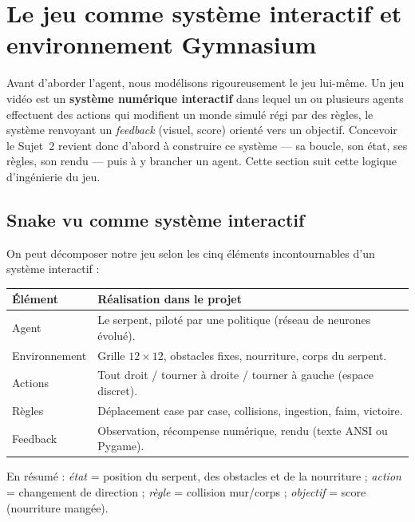 \documentclass[11pt,a4paper]{article}
\begin{document}
\section{Le jeu comme système interactif et environnement Gymnasium}

Avant d'aborder l'agent, nous modélisons rigoureusement le jeu lui-même. Un jeu
vidéo est un \textbf{système numérique interactif} dans lequel un ou plusieurs
agents effectuent des actions qui modifient un monde simulé régi par des règles,
le système renvoyant un \emph{feedback} (visuel, score) orienté vers un objectif.
Concevoir le Sujet~2 revient donc d'abord à construire ce système — sa boucle, son
état, ses règles, son rendu — puis à y brancher un agent. Cette section suit cette
logique d'ingénierie du jeu.

\subsection{Snake vu comme système interactif}
On peut décomposer notre jeu selon les cinq éléments incontournables d'un système
interactif :
\begin{center}
\begin{tabular}{ll}
\toprule
\textbf{Élément} & \textbf{Réalisation dans le projet} \\
\midrule
Agent          & Le serpent, piloté par une politique (réseau de neurones évolué). \\
Environnement  & Grille $12\times12$, obstacles fixes, nourriture, corps du serpent. \\
Actions        & Tout droit / tourner à droite / tourner à gauche (espace discret). \\
Règles         & Déplacement case par case, collisions, ingestion, faim, victoire. \\
Feedback       & Observation, récompense numérique, rendu (texte ANSI ou Pygame). \\
\bottomrule
\end{tabular}
\end{center}
\noindent En résumé : \emph{état} = position du serpent, des obstacles et de la
nourriture ; \emph{action} = changement de direction ; \emph{règle} = collision
mur/corps ; \emph{objectif} = score (nourriture mangée).
\end{document}
